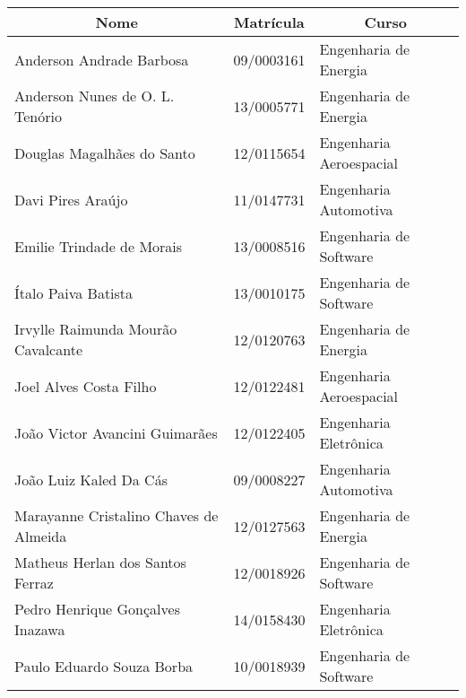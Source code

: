 \begin{resumo}[Autores]

\begin{table}[!h]
\centering
\label{my-label}
\begin{tabular}{|l|l|l|}
\hline
\multicolumn{1}{|c|}{\textbf{Nome}}    & \multicolumn{1}{c|}{\textbf{Matrícula}} & \multicolumn{1}{c|}{\textbf{Curso}} \\ \hline
Anderson Andrade Barbosa        & 09/0003161                              & Engenharia de Energia               \\ \hline
Anderson Nunes de O. L. Tenório               & 13/0005771                             & Engenharia de Energia               \\ \hline
Douglas Magalhães do Santo             & 12/0115654                              & Engenharia Aeroespacial             \\ \hline
Davi Pires Araújo                      & 11/0147731                              & Engenharia Automotiva               \\ \hline
Emilie Trindade de Morais              & 13/0008516                              & Engenharia de Software              \\ \hline
Ítalo Paiva Batista                    & 13/0010175                              & Engenharia de Software              \\ \hline
Irvylle Raimunda Mourão Cavalcante     & 12/0120763                              & Engenharia de Energia               \\ \hline
Joel Alves Costa Filho                 & 12/0122481                              & Engenharia Aeroespacial             \\ \hline
João Victor Avancini Guimarães         & 12/0122405                              & Engenharia Eletrônica               \\ \hline
João Luiz Kaled Da Cás                 & 09/0008227                              & Engenharia Automotiva               \\ \hline
Marayanne Cristalino Chaves de Almeida & 12/0127563                              & Engenharia de Energia               \\ \hline
Matheus Herlan dos Santos Ferraz       & 12/0018926                              & Engenharia de Software              \\ \hline
Pedro Henrique Gonçalves Inazawa       & 14/0158430                              & Engenharia Eletrônica               \\ \hline
Paulo Eduardo Souza Borba              & 10/0018939                              & Engenharia de Software              \\ \hline
\end{tabular}
\end{table}

\end{resumo}
\pagebreak

